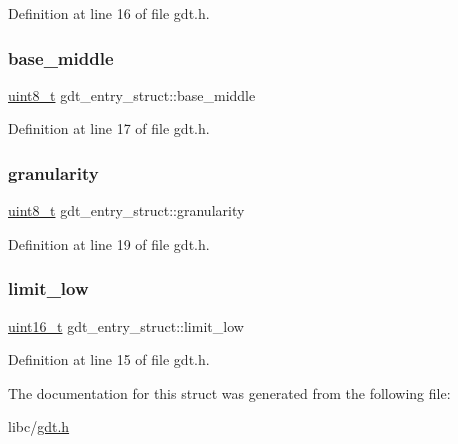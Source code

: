 Definition at line 16 of file gdt.\+h.

\mbox{\label{a00142_a986d46963d3ccdbec85b3749c1e09abf_a986d46963d3ccdbec85b3749c1e09abf}} 
\subsubsection{\texorpdfstring{base\+\_\+middle}{base\_middle}}
{\footnotesize\ttfamily \hyperlink{a00092_aba7bc1797add20fe3efdf37ced1182c5_aba7bc1797add20fe3efdf37ced1182c5}{uint8\+\_\+t} gdt\+\_\+entry\+\_\+struct\+::base\+\_\+middle}



Definition at line 17 of file gdt.\+h.

\mbox{\label{a00142_a7fb7b3704e10434dbe64564416cf1a25_a7fb7b3704e10434dbe64564416cf1a25}} 
\subsubsection{\texorpdfstring{granularity}{granularity}}
{\footnotesize\ttfamily \hyperlink{a00092_aba7bc1797add20fe3efdf37ced1182c5_aba7bc1797add20fe3efdf37ced1182c5}{uint8\+\_\+t} gdt\+\_\+entry\+\_\+struct\+::granularity}



Definition at line 19 of file gdt.\+h.

\mbox{\label{a00142_a6bbf5ad7af7b8e8e7f7c26ec74d8c1b2_a6bbf5ad7af7b8e8e7f7c26ec74d8c1b2}} 
\subsubsection{\texorpdfstring{limit\+\_\+low}{limit\_low}}
{\footnotesize\ttfamily \hyperlink{a00092_a273cf69d639a59973b6019625df33e30_a273cf69d639a59973b6019625df33e30}{uint16\+\_\+t} gdt\+\_\+entry\+\_\+struct\+::limit\+\_\+low}



Definition at line 15 of file gdt.\+h.



The documentation for this struct was generated from the following file\+:\begin{DoxyCompactItemize}
\item 
libc/\hyperlink{a00059}{gdt.\+h}\end{DoxyCompactItemize}
